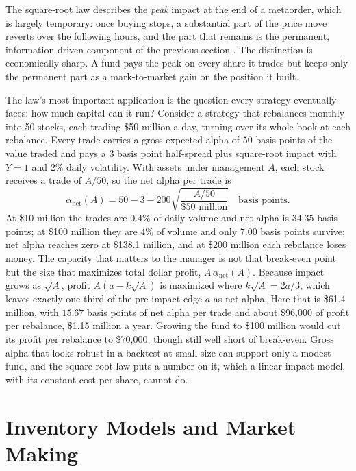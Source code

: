 \documentclass[../ai_in_finance]{subfiles}
\begin{document}
The square-root law describes the \emph{peak} impact at the end of a metaorder, which is largely temporary: once buying stops, a substantial part of the price move reverts over the following hours, and the part that remains is the permanent, information-driven component of the previous section \parencite{bacry2015market}. The distinction is economically sharp. A fund pays the peak on every share it trades but keeps only the permanent part as a mark-to-market gain on the position it built.

The law's most important application is the question every strategy eventually faces: how much capital can it run? Consider a strategy that rebalances monthly into 50 stocks, each trading \$50 million a day, turning over its whole book at each rebalance. Every trade carries a gross expected alpha of $50$ basis points of the value traded and pays a $3$ basis point half-spread plus square-root impact with $Y=1$ and $2\%$ daily volatility. With assets under management $A$, each stock receives a trade of $A/50$, so the net alpha per trade is
\begin{equation*}
\alpha_{\text{net}}(A) = 50 - 3 - 200\sqrt{\frac{A/50}{\$50\text{ million}}} \quad\text{basis points}.
\end{equation*}
At \$10 million the trades are $0.4\%$ of daily volume and net alpha is $34.35$ basis points; at \$100 million they are $4\%$ of volume and only $7.00$ basis points survive; net alpha reaches zero at \$138.1 million, and at \$200 million each rebalance loses money. The capacity that matters to the manager is not that break-even point but the size that maximizes total dollar profit, $A\,\alpha_{\text{net}}(A)$. Because impact grows as $\sqrt{A}$, profit $A(a - k\sqrt{A})$ is maximized where $k\sqrt{A}=2a/3$, which leaves exactly one third of the pre-impact edge $a$ as net alpha. Here that is \$61.4 million, with $15.67$ basis points of net alpha per trade and about \$96,000 of profit per rebalance, \$1.15 million a year. Growing the fund to \$100 million would cut its profit per rebalance to \$70,000, though still well short of break-even. Gross alpha that looks robust in a backtest at small size can support only a modest fund, and the square-root law puts a number on it, which a linear-impact model, with its constant cost per share, cannot do.

\section{Inventory Models and Market Making}
\label{sec:inventory}
\end{document}
